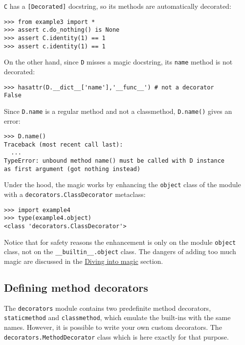 \documentclass[11pt,english]{article}
\begin{document}
\texttt{C} has a \texttt{[Decorated]} docstring, so its methods
are automatically decorated:
\begin{verbatim}>>> from example3 import *
>>> assert c.do_nothing() is None
>>> assert C.identity(1) == 1
>>> assert c.identity(1) == 1 \end{verbatim}

On the other hand, since \texttt{D} misses a magic docstring,
its \texttt{name} method is not decorated:
\begin{verbatim}>>> hasattr(D.__dict__['name'],'__func__') # not a decorator
False\end{verbatim}

Since \texttt{D.name} is a regular method and not a classmethod, \texttt{D.name()}
gives an error:
\begin{verbatim}>>> D.name()
Traceback (most recent call last):
  ...
TypeError: unbound method name() must be called with D instance 
as first argument (got nothing instead)\end{verbatim}

Under the hood, the magic works by enhancing the \texttt{object} class 
of the module with a \texttt{decorators.ClassDecorator} metaclass:
\begin{verbatim}>>> import example4
>>> type(example4.object)
<class 'decorators.ClassDecorator'>\end{verbatim}

Notice that for safety reasons the enhancement is only on the module 
\texttt{object} class, not on the \texttt{{\_}{\_}builtin{\_}{\_}.object} class. The dangers of
adding too much magic are discussed in the \href{#diving-into-magic}{Diving into magic} section.



\hypertarget{defining-method-decorators}{}
\subsection*{Defining method decorators}

The \texttt{decorators} module contains two predefinite method decorators, 
\texttt{staticmethod} and \texttt{classmethod}, which emulate the built-ins 
with the same names. However, it is possible to write your own
custom decorators. The \texttt{decorators.MethodDecorator} class which is here 
exactly for that purpose.
\end{document}
